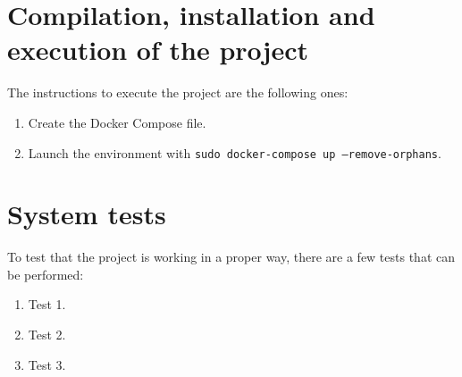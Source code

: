 \section{Compilation, installation and execution of the project}
\nonzeroparskip The instructions to execute the project are the following ones:
\begin{enumerate}
	\item Create the Docker Compose file.
	\item Launch the environment with \texttt{sudo docker-compose up --remove-orphans}.
\end{enumerate}

\section{System tests}
\nonzeroparskip To test that the project is working in a proper way, there are a few tests that can be performed:
\begin{enumerate}
	\item Test 1.
	\item Test 2.
	\item Test 3.
\end{enumerate}